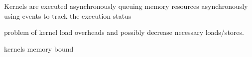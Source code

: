 Kernels are executed asynchronously
queuing memory resources asynchronously
using events to track the execution status

problem of kernel load overheads and possibly decrease
necessary loads/stores.

kernels memory bound

%
%
%







%
%
%
%
